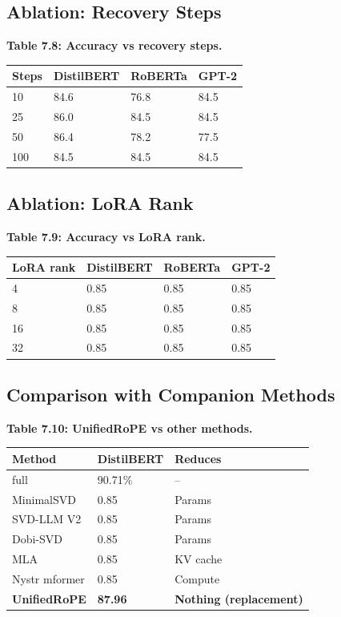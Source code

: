 \subsection{Ablation: Recovery Steps}

\textbf{Table 7.8: Accuracy vs recovery steps.}

\begin{table}[H]
\centering
\small
\begin{tabular}{llll}
\toprule
\textbf{Steps} & \textbf{DistilBERT} & \textbf{RoBERTa} & \textbf{GPT-2} \\
\midrule
10 & 84.6 & 76.8 & 84.5 \\
25 & 86.0 & 84.5 & 84.5 \\
50 & 86.4 & 78.2 & 77.5 \\
100 & 84.5 & 84.5 & 84.5 \\
\bottomrule
\end{tabular}
\end{table}

\subsection{Ablation: LoRA Rank}

\textbf{Table 7.9: Accuracy vs LoRA rank.}

\begin{table}[H]
\centering
\small
\begin{tabular}{llll}
\toprule
\textbf{LoRA rank} & \textbf{DistilBERT} & \textbf{RoBERTa} & \textbf{GPT-2} \\
\midrule
4 & 0.85 & 0.85 & 0.85 \\
8 & 0.85 & 0.85 & 0.85 \\
16 & 0.85 & 0.85 & 0.85 \\
32 & 0.85 & 0.85 & 0.85 \\
\bottomrule
\end{tabular}
\end{table}

\subsection{Comparison with Companion Methods}

\textbf{Table 7.10: UnifiedRoPE vs other methods.}

\begin{table}[H]
\centering
\small
\begin{tabular}{lll}
\toprule
\textbf{Method} & \textbf{DistilBERT} & \textbf{Reduces} \\
\midrule
full & 90.71\% & -- \\
MinimalSVD & 0.85 & Params \\
SVD-LLM V2 & 0.85 & Params \\
Dobi-SVD & 0.85 & Params \\
MLA & 0.85 & KV cache \\
Nystr mformer & 0.85 & Compute \\
\textbf{UnifiedRoPE} & \textbf{87.96} & \textbf{Nothing (replacement)} \\
\bottomrule
\end{tabular}
\end{table}

